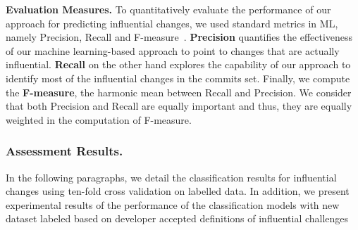 \textbf{Evaluation Measures.}
To quantitatively evaluate the performance of our approach for predicting influential changes,
we used standard metrics in ML, namely Precision, Recall and
F-measure~\cite{mlbook,kim_classifying_2008,stat2}. {\bf Precision} quantifies the effectiveness of our machine learning-based approach to point to changes that are actually influential. {\bf Recall} on the other hand explores the capability of our approach to identify most of the influential changes in the commits set. Finally, we compute the {\bf F-measure}, the harmonic mean between Recall and Precision. We consider that both Precision and Recall are equally important and thus, they are equally weighted in the computation of F-measure.


\subsubsection{Assessment Results.}
In the following paragraphs, we detail the classification results for
influential changes using ten-fold cross validation on labelled
data. In addition, we present experimental results of the performance of the classification models with new dataset labeled based on developer accepted definitions of influential challenges


